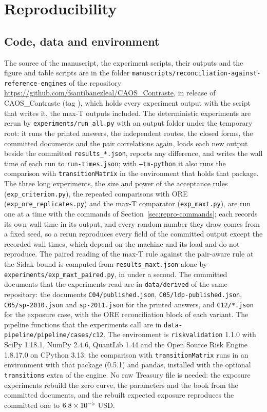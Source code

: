 \section{Reproducibility}
\label{sec:reproducibility}

\subsection{Code, data and environment}
\label{sec:repro-code}

The source of the manuscript, the experiment scripts, their outputs and the figure and table scripts are in the folder \texttt{manuscripts/reconciliation-against-reference-engines} of the repository \url{https://github.com/fsantibanezleal/CAOS_Contraste}, in release \docversion{} of CAOS\_Contraste (tag \texttt{\docversion{}}), which holds every experiment output with the script that writes it, the max-T outputs included. %
The deterministic experiments are rerun by \texttt{experiments/run\_all.py} with an output folder under the temporary root: it runs the printed answers, the independent routes, the closed forms, the committed documents and the pair correlations again, loads each new output beside the committed \texttt{results\_*.json}, reports any difference, and writes the wall time of each run to \texttt{run-times.json}; with \texttt{--tm-python} it also runs the comparison with \texttt{transitionMatrix} in the environment that holds that package. The three long experiments, the size and power of the acceptance rules (\texttt{exp\_criterion.py}), the repeated comparisons with ORE (\texttt{exp\_ore\_replicates.py}) and the max-T comparator (\texttt{exp\_maxt.py}), are run one at a time with the commands of Section~\ref{sec:repro-commands}; each records its own wall time in its output, and every random number they draw comes from a fixed seed, so a rerun reproduces every field of the committed output except the recorded wall times, which depend on the machine and its load and do not reproduce. The paired reading of the max-T rule against the pair-aware rule at the Sidak bound is computed from \texttt{results\_maxt.json} alone by \texttt{experiments/exp\_maxt\_paired.py}, in under a second. The committed documents that the experiments read are in \texttt{data/derived} of the same repository: the documents \texttt{C04/published.json}, \texttt{C05/ldp-published.json}, \texttt{C05/sp-2010.json} and \texttt{sp-2011.json} for the printed answers, and \texttt{C12/*.json} for the exposure case, with the ORE reconciliation block of each variant. The pipeline functions that the experiments call are in \texttt{data-pipeline/pipeline/cases/c12}. The environment is \texttt{riskvalidation} 1.1.0 with SciPy 1.18.1, NumPy 2.4.6, QuantLib 1.44 and the Open Source Risk Engine 1.8.17.0 on CPython 3.13; the comparison with \texttt{transitionMatrix} runs in an environment with that package (0.5.1) and pandas, installed with the optional \texttt{transitions} extra of the engine. No raw Treasury file is needed: the exposure experiments rebuild the zero curve, the parameters and the book from the committed documents, and the rebuilt expected exposure reproduces the committed one to $6.8\times10^{-5}$ USD.

